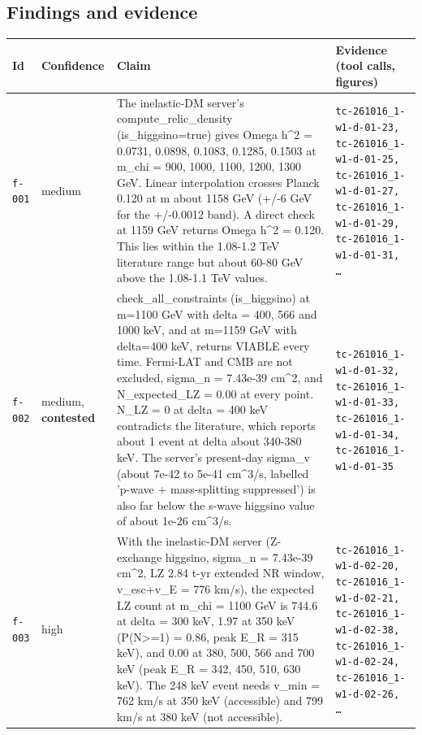 \documentclass[11pt,a4paper]{article}
\begin{document}
\subsection{Findings and evidence}
\begin{longtable}{@{}p{}p{}p{}p{}@{}}
\toprule Id & Confidence & Claim & Evidence (tool calls, figures) \\ \midrule \endhead
\texttt{f-001} & medium & The inelastic-DM server's compute\_relic\_density (is\_higgsino=true) gives Omega h\textasciicircum{}2 = 0.0731, 0.0898, 0.1083, 0.1285, 0.1503 at m\_chi = 900, 1000, 1100, 1200, 1300 GeV. Linear interpolation crosses Planck 0.120 at m about 1158 GeV (+/-6 GeV for the +/-0.0012 band). A direct check at 1159 GeV returns Omega h\textasciicircum{}2 = 0.120. This lies within the 1.08-1.2 TeV literature range but about 60-80 GeV above the 1.08-1.1 TeV values. & \texttt{tc-261016\_\allowbreak{}1-w1-d-01-23,\allowbreak{} tc-261016\_\allowbreak{}1-w1-d-01-25,\allowbreak{} tc-261016\_\allowbreak{}1-w1-d-01-27,\allowbreak{} tc-261016\_\allowbreak{}1-w1-d-01-29,\allowbreak{} tc-261016\_\allowbreak{}1-w1-d-01-31,\allowbreak{} \ldots{}\allowbreak{}} \\
\texttt{f-002} & medium, \textbf{contested} & check\_all\_constraints (is\_higgsino) at m=1100 GeV with delta = 400, 566 and 1000 keV, and at m=1159 GeV with delta=400 keV, returns VIABLE every time. Fermi-LAT and CMB are not excluded, sigma\_n = 7.43e-39 cm\textasciicircum{}2, and N\_expected\_LZ = 0.00 at every point. N\_LZ = 0 at delta = 400 keV contradicts the literature, which reports about 1 event at delta about 340-380 keV. The server's present-day sigma\_v (about 7e-42 to 5e-41 cm\textasciicircum{}3/s, labelled 'p-wave + mass-splitting suppressed') is also far below the s-wave higgsino value of about 1e-26 cm\textasciicircum{}3/s. & \texttt{tc-261016\_\allowbreak{}1-w1-d-01-32,\allowbreak{} tc-261016\_\allowbreak{}1-w1-d-01-33,\allowbreak{} tc-261016\_\allowbreak{}1-w1-d-01-34,\allowbreak{} tc-261016\_\allowbreak{}1-w1-d-01-35} \\
\texttt{f-003} & high & With the inelastic-DM server (Z-exchange higgsino, sigma\_n = 7.43e-39 cm\textasciicircum{}2, LZ 2.84 t-yr extended NR window, v\_esc+v\_E = 776 km/s), the expected LZ count at m\_chi = 1100 GeV is 744.6 at delta = 300 keV, 1.97 at 350 keV (P(N\textgreater{}=1) = 0.86, peak E\_R = 315 keV), and 0.00 at 380, 500, 566 and 700 keV (peak E\_R = 342, 450, 510, 630 keV). The 248 keV event needs v\_min = 762 km/s at 350 keV (accessible) and 799 km/s at 380 keV (not accessible). & \texttt{tc-261016\_\allowbreak{}1-w1-d-02-20,\allowbreak{} tc-261016\_\allowbreak{}1-w1-d-02-21,\allowbreak{} tc-261016\_\allowbreak{}1-w1-d-02-38,\allowbreak{} tc-261016\_\allowbreak{}1-w1-d-02-24,\allowbreak{} tc-261016\_\allowbreak{}1-w1-d-02-26,\allowbreak{} \ldots{}\allowbreak{}} \\

\end{longtable}
\end{document}

